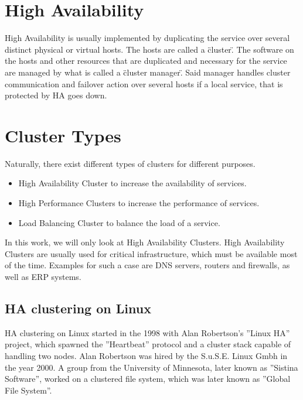 \section{High Availability}


High Availability is usually implemented by duplicating the service over several distinct physical or
virtual hosts. The hosts are called a \"cluster\". The software on the hosts and other resources
that are duplicated and necessary for the service are managed by what is called a \"cluster manager\".
Said manager handles cluster communication and failover action over several hosts if a local service,
that is protected by \ac{HA} goes down.

\section{Cluster Types}

Naturally, there exist different types of clusters for different purposes.
\begin{itemize}
\item High Availability Cluster to increase the availability of services.
\item High Performance Clusters to increase the performance of services.
\item Load Balancing Cluster to balance the load of a service.
\end{itemize}

In this work, we will only look at High Availability Clusters.
High Availability Clusters are usually used for critical infrastructure,
which must be available most of the time. Examples for such a case are DNS servers,
routers and firewalls, as well as \ac{ERP} systems.

\subsection{\ac{HA} clustering on Linux}

\ac{HA} clustering on Linux started in the 1998  with Alan Robertson's ''Linux HA'' project,
which spawned the ''Heartbeat'' protocol and a cluster stack capable of handling two nodes.
Alan Robertson was hired by the S.u.S.E. Linux Gmbh in the year 2000.
A group from the University of Minnesota, later known as ''Sistina Software'', worked
on a clustered file system, which was later known as ''Global File System''.
\cite{prologue}


